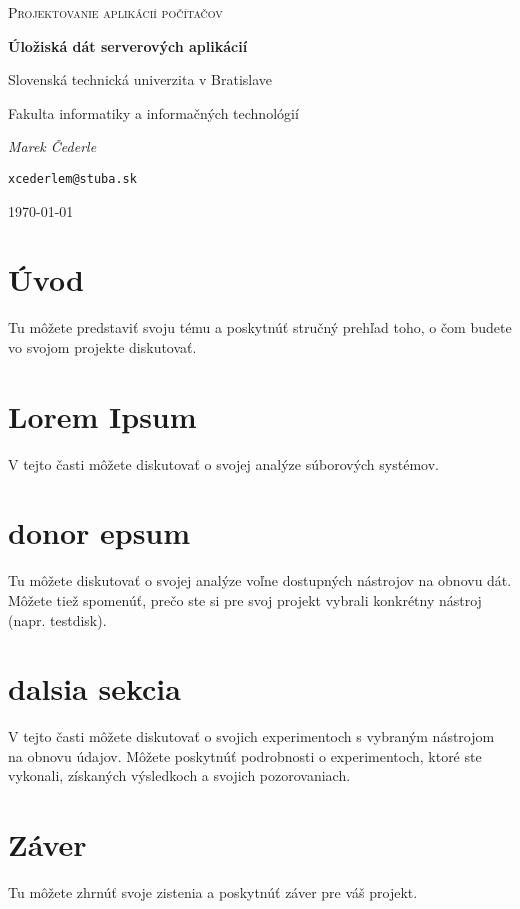 \documentclass[12pt,oneside,slovak,a4paper]{article}
\begin{document}

\begin{titlepage}
	\centering
	{\LARGE \textsc{}\par}
	\vspace{5cm}
	{\Large \textsc{Projektovanie aplikácií počítačov}\par}
	\vspace{1.5cm}
	{\huge\bfseries Úložiská dát serverových aplikácií\par}
    \vspace{1cm}
    {\large Slovenská technická univerzita v Bratislave\par}
    {\large Fakulta informatiky a informačných technológií\par}
	\vspace{1cm}
	{\Large\itshape Marek Čederle\par}
    {\small\texttt{xcederlem@stuba.sk}\par}
	\vfill

	{\large \today\par}
\end{titlepage}


\tableofcontents
\vspace*{\fill}

\section{Úvod}
Tu môžete predstaviť\cite{TEST} svoju tému a poskytnúť stručný prehľad toho, o čom budete vo svojom projekte diskutovať.

\section{Lorem Ipsum}
V tejto časti môžete diskutovať o svojej analýze súborových systémov.

\section{donor epsum}
Tu môžete diskutovať o svojej analýze voľne dostupných nástrojov na obnovu dát. Môžete tiež spomenúť, prečo ste si pre svoj projekt vybrali konkrétny nástroj (napr. testdisk).

\section{dalsia sekcia}
V tejto časti môžete diskutovať o svojich experimentoch s vybraným nástrojom na obnovu údajov. Môžete poskytnúť podrobnosti o experimentoch, ktoré ste vykonali, získaných výsledkoch a svojich pozorovaniach.

\section{Záver}
Tu môžete zhrnúť svoje zistenia a poskytnúť záver pre váš projekt.



\end{document}

